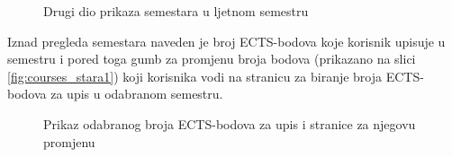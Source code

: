\documentclass[times, utf8, zavrsni, numeric]{fer}
\begin{document}
        \begin{figure} [H]
          \centering
          \caption{Drugi dio prikaza semestara u ljetnom semestru}
          \label{fig:courses_stara2}
        \end{figure}
        
        \noindent Iznad pregleda semestara naveden je broj ECTS-bodova koje korisnik upisuje u semestru i pored toga gumb za promjenu broja bodova (prikazano na slici \ref{fig:courses_stara1}) koji korisnika vodi na stranicu za biranje broja ECTS-bodova za upis u odabranom semestru.
        
        \begin{figure} [H]
          \centering
          \caption{Prikaz odabranog broja ECTS-bodova za upis i stranice za njegovu promjenu}
        \end{figure}
        
\end{document}
